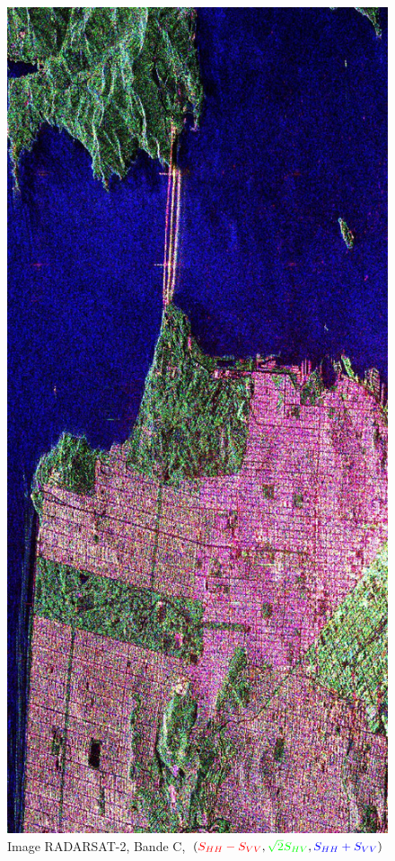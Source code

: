 \begin{figure}
  \includegraphics[height=0.95\textheight]{figures/Chap4/RADARSAT2-T3_RGB_reh.jpg}
  \centering
  \caption{
  \small{Image RADARSAT-2, Bande C, $(\textcolor{red}{S_{HH}-S_{VV}}, \textcolor{green}{\sqrt{2}S_{HV}}, \textcolor{blue}{S_{HH}+S_{VV}})$}
  }
  \label{fig:sanfrancisco-radarsat2-diagram}
\end{figure}

